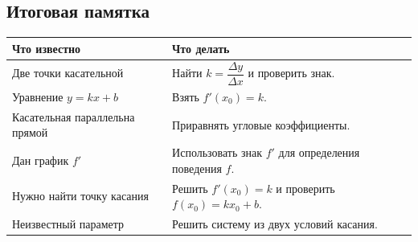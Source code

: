 \documentclass[a4paper,12pt]{article}
\begin{document}
\vspace{12mm}
\subsection{Итоговая памятка}
\begin{center}
\begin{tabularx}{\linewidth}{@{}>{\raggedright\arraybackslash}p{.36\linewidth}X@{}}
\toprule
\textbf{Что известно} & \textbf{Что делать}\\
\midrule
Две точки касательной & Найти $k=\dfrac{\Delta y}{\Delta x}$ и проверить знак.\\
Уравнение $y=kx+b$ & Взять $f'(x_0)=k$.\\
Касательная параллельна прямой & Приравнять угловые коэффициенты.\\
Дан график $f'$ & Использовать знак $f'$ для определения поведения $f$.\\
Нужно найти точку касания & Решить $f'(x_0)=k$ и проверить $f(x_0)=kx_0+b$.\\
Неизвестный параметр & Решить систему из двух условий касания.\\
\bottomrule
\end{tabularx}
\end{center}
\end{document}
